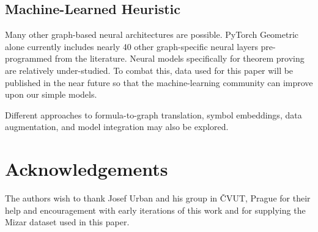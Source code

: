 \documentclass[runningheads]{llncs}
\begin{document}
\subsection{Machine-Learned Heuristic}
Many other graph-based neural architectures are possible.
PyTorch Geometric alone currently includes nearly 40 other graph-specific neural layers pre-programmed from the literature.
Neural models specifically for theorem proving are relatively under-studied.
To combat this, data used for this paper will be published in the near future so that the machine-learning community can improve upon our simple models.

Different approaches to formula-to-graph translation, symbol embeddings, data augmentation, and model integration may also be explored.

\section{Acknowledgements}
The authors wish to thank Josef Urban and his group in \v{C}VUT, Prague for their help and encouragement with early iterations of this work and for supplying the Mizar dataset used in this paper.



\end{document}
